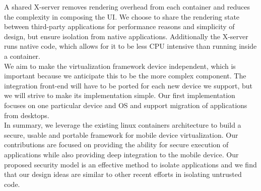 A shared X-server removes rendering overhead from each container and reduces the complexity in composing the UI. We choose to share the rendering state between third-party applications for performance reasons and simplicity of design, but ensure isolation from native applications. Additionally the X-server runs native code, which allows for it to be less CPU intensive than running inside a container. \\

We aim to make the virtualization framework device independent, which is important because we anticipate this to be the more complex component. The integration front-end will have to be ported for each new device we support, but we will strive to make its implementation simple. Our first implementation focuses on one particular device and OS and support  migration of applications from desktops. \\

In summary, we leverage the existing linux containers architecture to build a secure, usable and portable framework for mobile device virtualization. Our contributions are focused on providing the ability for secure execution of applications while also providing deep integration to the mobile device. Our proposed security model is an effective method to isolate applications and we find that our design ideas are similar to other recent efforts \cite{grier2008secure} in isolating untrusted code. \\

